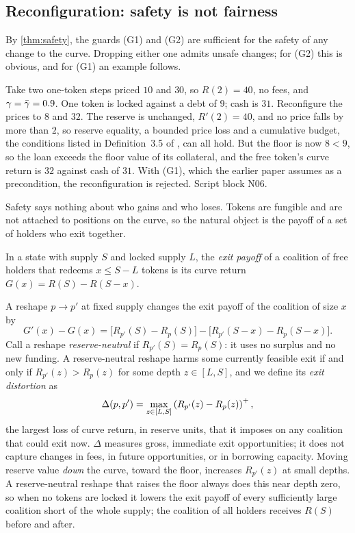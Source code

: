 \subsection{Reconfiguration: safety is not fairness}\label{sec:reconf}

By \cref{thm:safety}, the guards (G1) and (G2) are sufficient for the safety of any change to the curve. Dropping either one admits unsafe changes; for (G2) this is obvious, and for (G1) an example follows.

\begin{example}\label{ex:reconf}
Take two one-token steps priced $10$ and $30$, so $R(2)=40$, no fees, and $\gamma=\bar\gamma=0.9$. One token is locked against a debt of $9$; cash is $31$. Reconfigure the prices to $8$ and $32$. The reserve is unchanged, $R'(2)=40$, and no price falls by more than $2$, so reserve equality, a bounded price loss and a cumulative budget, the conditions listed in Definition~3.5 of \vone, can all hold. But the floor is now $8<9$, so the loan exceeds the floor value of its collateral, and the free token's curve return is $32$ against cash of $31$. With (G1), which the earlier paper assumes as a precondition, the reconfiguration is rejected. Script block N06.
\end{example}

Safety says nothing about who gains and who loses. Tokens are fungible and are not attached to positions on the curve, so the natural object is the payoff of a set of holders who exit together.

\begin{definition}
In a state with supply $S$ and locked supply $L$, the \emph{exit payoff} of a coalition of free holders that redeems $x\le S-L$ tokens is its curve return $G(x)=R(S)-R(S-x)$.
\end{definition}

A reshape $p\to p'$ at fixed supply changes the exit payoff of the coalition of size $x$ by
\[
G'(x)-G(x)=\bigl[R_{p'}(S)-R_p(S)\bigr]-\bigl[R_{p'}(S-x)-R_p(S-x)\bigr].
\]
Call a reshape \emph{reserve-neutral} if $R_{p'}(S)=R_p(S)$: it uses no surplus and no new funding. A reserve-neutral reshape harms some currently feasible exit if and only if $R_{p'}(z)>R_p(z)$ for some depth $z\in[L,S]$, and we define its \emph{exit distortion} as
\[
\Delta(p,p')=\max_{z\in[L,S]}\left(R_{p'}(z)-R_p(z)\right)^{+},
\]
the largest loss of curve return, in reserve units, that it imposes on any coalition that could exit now. $\Delta$ measures gross, immediate exit opportunities; it does not capture changes in fees, in future opportunities, or in borrowing capacity. Moving reserve value \emph{down} the curve, toward the floor, increases $R_{p'}(z)$ at small depths. A reserve-neutral reshape that raises the floor always does this near depth zero, so when no tokens are locked it lowers the exit payoff of every sufficiently large coalition short of the whole supply; the coalition of all holders receives $R(S)$ before and after.

